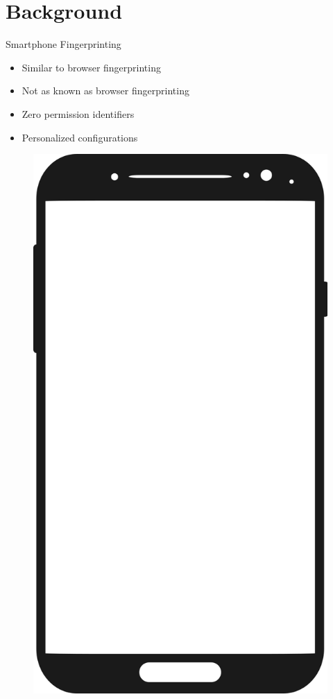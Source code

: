 \documentclass[aspectratio=169]{beamer}
[aspectratio=169] %
\begin{document}
\section{Background}

\begin{frame}{Smartphone Fingerprinting}
  \begin{minipage}{0.49\textwidth} 
    \begin{itemize}
      \item Similar to browser fingerprinting
      \pause
      \item Not as known as browser fingerprinting
      \pause
      \item Zero permission identifiers
      \pause
      \item Personalized configurations
    \end{itemize}
  \end{minipage}
  \hfill
  \begin{minipage}{0.49\textwidth} 
    \begin{figure}
      \centering
      \includegraphics[height=0.5\textheight]{figures/smartphone.png}

\end{figure}
\end{minipage}
\end{frame}
\end{document}
